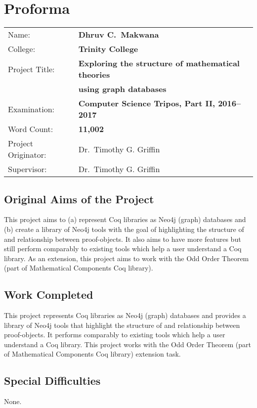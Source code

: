 \chapter*{Proforma}

{%
\begin{tabular}{ll}
Name:               & \bf Dhruv C.\ Makwana \\
College:            & \bf Trinity College                     \\
Project Title:      & \bf Exploring the structure of mathematical theories \\
                    & \bf using graph databases \\
Examination:        & \bf Computer Science Tripos, Part II, 2016--2017 \\
Word Count:         & \bf 11,002 \\
Project Originator: & Dr.\ Timothy G. Griffin \\
Supervisor:         & Dr.\ Timothy G. Griffin \\
\end{tabular}
}

\section*{Original Aims of the Project}

This project aims to (a) represent Coq libraries as Neo4j (graph) databases and
(b) create a library of Neo4j tools with the goal of highlighting the structure
of and relationship between proof-objects.  It also aims to have more features
but still perform comparably to existing tools which help a user understand a
Coq library. As an extension, this project aims to work with the Odd Order
Theorem (part of Mathematical Components Coq library).

\section*{Work Completed}

This project represents Coq libraries as Neo4j (graph) databases and provides a
library of Neo4j tools that highlight the structure of and relationship between
proof-objects. It performs comparably to existing tools which help a user
understand a Coq library. This project works with the Odd Order Theorem (part
of Mathematical Components Coq library) extension task.

\section*{Special Difficulties}
None.

